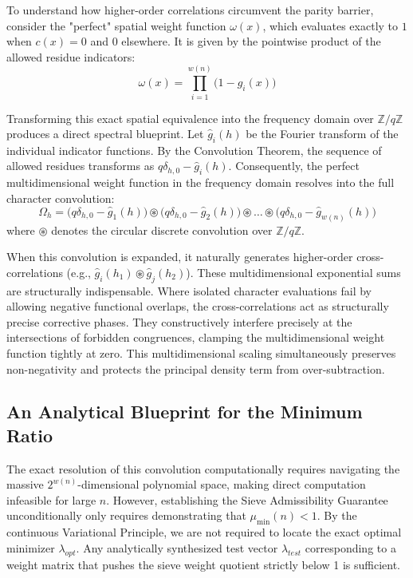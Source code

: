 \documentclass{ws-ijnt}
\begin{document}
To understand how higher-order correlations circumvent the parity barrier, consider the "perfect"
spatial weight function $\omega(x)$, which evaluates exactly to $1$ when $c(x) = 0$ and $0$ elsewhere.
It is given by the pointwise product of the allowed residue indicators:
$$ \omega(x) = \prod_{i=1}^{w(n)} \big(1 - g_i(x)\big) $$

Transforming this exact spatial equivalence into the frequency domain over $\mathbb{Z}/q\mathbb{Z}$
produces a direct spectral blueprint. Let $\hat{g}_i(h)$ be the Fourier transform
of the individual indicator functions. By the Convolution Theorem, the sequence of allowed
residues transforms as $q\delta_{h,0} - \hat{g}_i(h)$. Consequently, the
perfect multidimensional weight function in the frequency domain resolves into the full
character convolution:
$$ \Omega_h = \big(q\delta_{h,0} - \hat{g}_1(h)\big) \circledast \big(q\delta_{h,0} - \hat{g}_2(h)\big) \circledast \dots \circledast \big(q\delta_{h,0} - \hat{g}_{w(n)}(h)\big) $$
where $\circledast$ denotes the circular discrete convolution over $\mathbb{Z}/q\mathbb{Z}$.

When this convolution is expanded, it naturally generates higher-order cross-correlations (e.g.,
$\hat{g}_i(h_1) \circledast \hat{g}_j(h_2)$). These multidimensional exponential sums are structurally
indispensable. Where isolated character evaluations fail by allowing negative functional overlaps, the
cross-correlations act as structurally precise corrective phases. They constructively interfere
precisely at the intersections of forbidden congruences, clamping the multidimensional weight function
tightly at zero. This multidimensional scaling simultaneously preserves non-negativity and protects
the principal density term from over-subtraction.

\subsection{An Analytical Blueprint for the Minimum Ratio}

The exact resolution of this convolution computationally requires navigating the massive
$2^{w(n)}$-dimensional polynomial space, making direct computation infeasible
for large $n$. However, establishing the Sieve Admissibility Guarantee unconditionally only
requires demonstrating that $\mu_{\min}(n) < 1$. By the continuous Variational Principle, we are not
required to locate the exact optimal minimizer $\lambda_{opt}$. Any analytically synthesized test
vector $\lambda_{test}$ corresponding to a weight matrix that pushes the sieve weight quotient strictly
below 1 is sufficient. 
\end{document}
